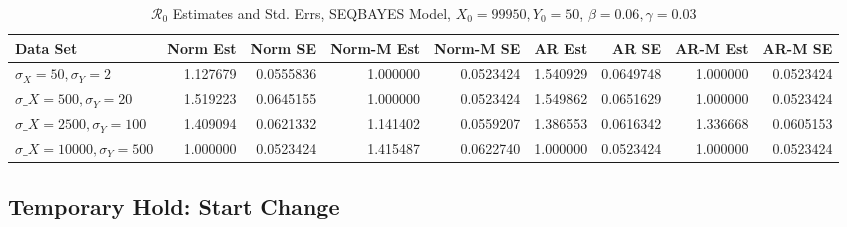 \documentclass[12pt]{article}
\newcommand{\rr}{\ensuremath{\mathcal{R}_0}}
\begin{document}
\begin{table}[H]
	
	\caption{\label{tab:}$\rr$ Estimates and Std. Errs, SEQBAYES Model,
		$X_0 = 99950, Y_0 = 50$, $\beta = 0.06, \gamma = 0.03$}
	\centering
	\begin{footnotesize}
	\begin{tabular}[t]{l|r|r|r|r|r|r|r|r}
		\hline
		Data Set & Norm Est & Norm SE & Norm-M Est & Norm-M SE & AR Est & AR SE & AR-M Est & AR-M SE\\
		\hline
		$\sigma_X = 50, \sigma_Y = 2$ & 1.127679 & 0.0555836 & 1.000000 & 0.0523424 & 1.540929 & 0.0649748 & 1.000000 & 0.0523424\\
		\hline
		$\sigma\_X = 500, \sigma_Y = 20$ & 1.519223 & 0.0645155 & 1.000000 & 0.0523424 & 1.549862 & 0.0651629 & 1.000000 & 0.0523424\\
		\hline
		$\sigma\_X = 2500, \sigma_Y = 100$ & 1.409094 & 0.0621332 & 1.141402 & 0.0559207 & 1.386553 & 0.0616342 & 1.336668 & 0.0605153\\
		\hline
		$\sigma\_X = 10000, \sigma_Y = 500$ & 1.000000 & 0.0523424 & 1.415487 & 0.0622740 & 1.000000 & 0.0523424 & 1.000000 & 0.0523424\\
		\hline
	\end{tabular}
\end{footnotesize}
\end{table}

\subsection{Temporary Hold: Start Change}
\end{document}
